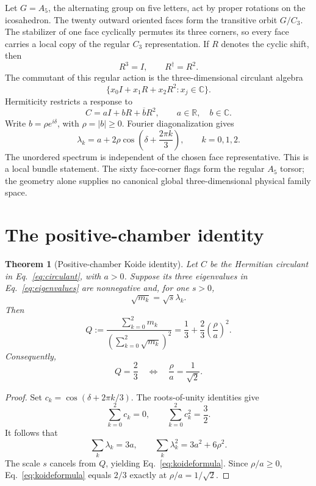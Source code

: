 \documentclass[11pt]{article}
\newtheorem{theorem}{Theorem}
\theoremstyle{remark}
\newcommand{\C}{\mathbb C}
\newcommand{\R}{\mathbb R}
\begin{document}
Let \(G=A_5\), the alternating group on five letters, act by proper rotations
on the icosahedron. The twenty outward
oriented faces form the transitive orbit \(G/C_3\). The stabilizer of one face
cyclically permutes its three corners, so every face carries a local copy of
the regular \(C_3\) representation. If \(R\) denotes the cyclic shift, then
\[
R^3=I,\qquad R^\dagger=R^2.
\]
The commutant of this regular action is the three-dimensional circulant
algebra
\[
\{x_0I+x_1R+x_2R^2:x_j\in\C\}.
\]
Hermiticity restricts a response to
\begin{equation}
C=aI+bR+\overline bR^2,\qquad a\in\R,\quad b\in\C.
\label{eq:circulant}
\end{equation}
Write \(b=\rho e^{i\delta}\), with \(\rho=|b|\geq0\). Fourier
diagonalization gives
\begin{equation}
\lambda_k=a+2\rho\cos\left(\delta+\frac{2\pi k}{3}\right),
\qquad k=0,1,2.
\label{eq:eigenvalues}
\end{equation}
The unordered spectrum is independent of the chosen face representative.
This is a local bundle statement. The sixty face-corner flags form the
regular \(A_5\) torsor; the geometry alone supplies no canonical global
three-dimensional physical family space.

\section{The positive-chamber identity}

\begin{theorem}[Positive-chamber Koide identity]
\label{thm:koide}
Let \(C\) be the Hermitian circulant in
Eq.~\eqref{eq:circulant}, with \(a>0\). Suppose its three eigenvalues in
Eq.~\eqref{eq:eigenvalues} are nonnegative and, for one \(s>0\),
\[
\sqrt{m_k}=\sqrt{s}\lambda_k.
\]
Then
\begin{equation}
Q:=\frac{\sum_{k=0}^2m_k}
{\left(\sum_{k=0}^2\sqrt{m_k}\right)^2}
=\frac13+\frac23\left(\frac{\rho}{a}\right)^2.
\label{eq:koideformula}
\end{equation}
Consequently,
\begin{equation}
Q=\frac23
\quad\Longleftrightarrow\quad
\frac{\rho}{a}=\frac1{\sqrt2}.
\label{eq:balance}
\end{equation}
\end{theorem}

\begin{proof}
Set \(c_k=\cos(\delta+2\pi k/3)\). The roots-of-unity identities give
\[
\sum_{k=0}^2c_k=0,
\qquad
\sum_{k=0}^2c_k^2=\frac32.
\]
It follows that
\[
\sum_k\lambda_k=3a,
\qquad
\sum_k\lambda_k^2=3a^2+6\rho^2.
\]
The scale \(s\) cancels from \(Q\), yielding
Eq.~\eqref{eq:koideformula}. Since \(\rho/a\geq0\),
Eq.~\eqref{eq:koideformula} equals \(2/3\) exactly at
\(\rho/a=1/\sqrt2\).
\end{proof}
\end{document}
